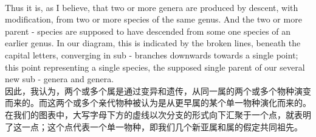 \documentclass{article}
\begin{document}
\\
Thus it is, as I believe, that two or more genera are produced by descent, with modification, from two or more species of the same genus. And the two or more parent - species are supposed to have descended from some one species of an earlier genus. In our diagram, this is indicated by the broken lines, beneath the capital letters, converging in sub - branches downwards towards a single point; this point representing a single species, the supposed single parent of our several new sub - genera and genera.\\
因此，我认为，两个或多个属是通过变异和遗传，从同一属的两个或多个物种演变而来的。而这两个或多个亲代物种被认为是从更早属的某个单一物种演化而来的。在我们的图表中，大写字母下方的虚线以次分支的形式向下汇聚于一个点，就表明了这一点；这个点代表一个单一物种，即我们几个新亚属和属的假定共同祖先。 \\
\end{document}
